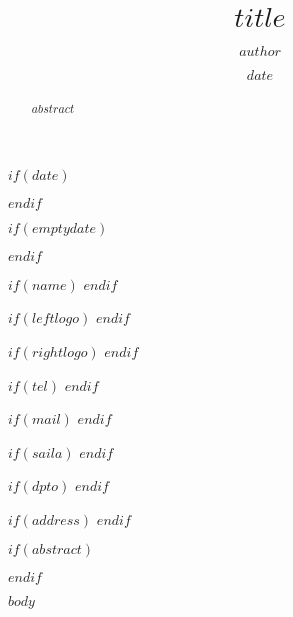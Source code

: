 \documentclass[$if(classoptions)$$classoptions$$endif$]{ifreport2}
\begin{document}
\title{$title$}
\author{$author$}

$if(date)$
\date{$date$}
$endif$

$if(emptydate)$
\date{}
$endif$

$if(name)$
$endif$

$if(leftlogo)$
$endif$

$if(rightlogo)$
$endif$

$if(tel)$
$endif$

$if(mail)$
$endif$

$if(saila)$
$endif$

$if(dpto)$
$endif$

$if(address)$
$endif$

\maketitle
$if(abstract)$
\begin{abstract}
$abstract$
\end{abstract}
$endif$


$body$
\end{document}
